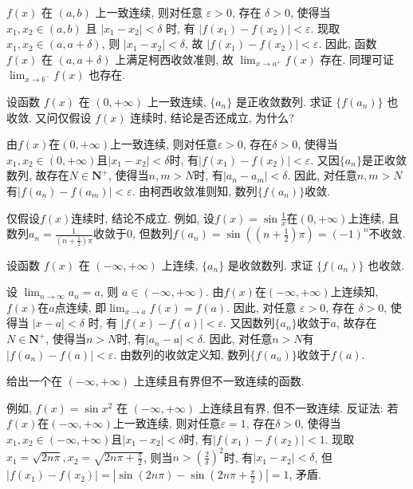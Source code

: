 \begin{solution}
    $f(x)$ 在 $(a,b)$ 上一致连续, 则对任意 $\varepsilon > 0$, 存在 $\delta > 0$, 使得当 $x_1, x_2 \in (a,b)$ 且 $|x_1 - x_2| < \delta$ 时, 有 $|f(x_1) - f(x_2)| < \varepsilon$. 现取 $x_1, x_2 \in (a, a+\delta)$, 则 $|x_1 - x_2| < \delta$, 故 $|f(x_1) - f(x_2)| < \varepsilon$. 因此, 函数 $f(x)$ 在 $(a, a+\delta)$ 上满足柯西收敛准则, 故 $\lim_{x \to a^+} f(x)$ 存在. 同理可证 $\lim_{x \to b^-} f(x)$ 也存在.
\end{solution}

\begin{exercise}[2.2.14]
    设函数 $f(x)$ 在 $(0, +\infty)$ 上一致连续, $\{a_n\}$ 是正收敛数列. 求证 $\{f(a_n)\}$ 也收敛. 又问仅假设 $f(x)$ 连续时, 结论是否还成立, 为什么?
\end{exercise}

\begin{solution}
    由$f(x)$在$(0,+\infty)$上一致连续, 则对任意$\varepsilon>0$, 存在$\delta>0$, 使得当$x_1,x_2\in(0,+\infty)$且$|x_1-x_2|<\delta$时, 有$|f(x_1)-f(x_2)|<\varepsilon$. 又因$\{a_n\}$是正收敛数列, 故存在$N\in\mathbf{N}^+$, 使得当$n,m>N$时, 有$|a_n-a_m|<\delta$. 因此, 对任意$n,m>N$有$|f(a_n)-f(a_m)|<\varepsilon$. 由柯西收敛准则知, 数列$\{f(a_n)\}$收敛.

    仅假设$f(x)$连续时, 结论不成立. 例如, 设$f(x)=\sin\frac{1}{x}$在$(0,+\infty)$上连续, 且数列$a_n=\frac{1}{(n+\frac{1}{2})\pi}$收敛于$0$, 但数列$f(a_n)=\sin\left( \left(n+\frac12\right) \pi\right)= (-1)^n$不收敛.
\end{solution}

\begin{exercise}[2.2.15]
    设函数 $f(x)$ 在 $(-\infty, +\infty)$ 上连续, $\{a_n\}$ 是收敛数列. 求证 $\{f(a_n)\}$ 也收敛.
\end{exercise}

\begin{solution}
    设 $\lim_{n \to \infty} a_n = a$, 则 $a \in (-\infty, +\infty)$. 由$f(x)$在$(-\infty,+\infty)$上连续知,$f(x)$在$a$点连续, 即$\lim_{x \to a} f(x) = f(a)$. 因此, 对任意 $\varepsilon > 0$, 存在 $\delta > 0$, 使得当 $|x - a| < \delta$ 时, 有 $|f(x) - f(a)| < \varepsilon$. 又因数列$\{a_n\}$收敛于$a$, 故存在$N\in\mathbf{N}^+$, 使得当$n>N$时, 有$|a_n-a|<\delta$. 因此, 对任意$n>N$有$|f(a_n)-f(a)|<\varepsilon$. 由数列的收敛定义知, 数列$\{f(a_n)\}$收敛于$f(a)$.
\end{solution}

\begin{exercise}[2.2.16]
    给出一个在 $(-\infty, +\infty)$ 上连续且有界但不一致连续的函数.
\end{exercise}

\begin{solution}
    例如, $f(x) = \sin x^2$ 在 $(-\infty, +\infty)$ 上连续且有界, 但不一致连续. 反证法: 若$f(x)$在$(-\infty,+\infty)$上一致连续, 则对任意$\varepsilon=1$, 存在$\delta>0$, 使得当$x_1,x_2\in(-\infty,+\infty)$且$|x_1-x_2|<\delta$时, 有$|f(x_1)-f(x_2)|<1$. 现取$x_1=\sqrt{2n\pi}, x_2=\sqrt{2n\pi+\frac{\pi}{2}}$, 则当$n>\left(\frac{2}{\delta}\right)^2$时, 有$|x_1-x_2|<\delta$, 但$|f(x_1)-f(x_2)|=\left|\sin(2n\pi)-\sin\left(2n\pi+\frac{\pi}{2}\right)\right|=1$, 矛盾.
\end{solution}

\newpage
